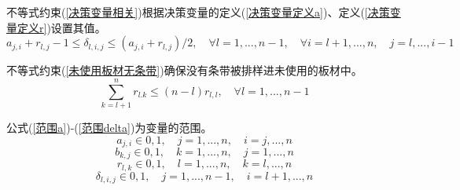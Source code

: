 \documentclass[bwprint]{gmcmthesis}
\begin{document}
不等式约束(\ref{决策变量相关})根据决策变量的定义(\ref{决策变量定义a})、定义(\ref{决策变量定义r})设置其值。
\begin{equation}
    a_{j,i}+r_{l,j}-1 \le \delta_{l,i,j} \le (a_{j,i}+r_{l,j})/2, \quad \forall l=1,...,n-1,\quad \forall i=l+1,...,n,\quad j=l,...,i-1 \label{决策变量相关}
\end{equation}

不等式约束(\ref{未使用板材无条带})确保没有条带被排样进未使用的板材中。
\begin{equation}
    \sum_{k=l+1}^{n} r_{l.k} \le (n-l)r_{l,l}, \quad \forall l=1,...,n-1 \label{未使用板材无条带}
\end{equation}

公式(\ref{范围a})-(\ref{范围delta})为变量的范围。
\begin{equation}
    a_{j,i} \in {0,1}, \quad j=1,...,n , \quad i=j,...,n \label{范围a}
\end{equation}
\begin{equation}
    b_{k,j} \in {0,1}, \quad k=1,...,n , \quad j=1,...,n \label{范围b}
\end{equation}
\begin{equation}
    r_{l,k} \in {0,1}, \quad l=1,...,n , \quad k=l,...,n \label{范围r}
\end{equation}
\begin{equation}
    \delta_{l,i,j} \in {0,1}, \quad j=1,...,n-1 , \quad i=l+1,...,n \label{范围delta}
\end{equation}
\end{document}
